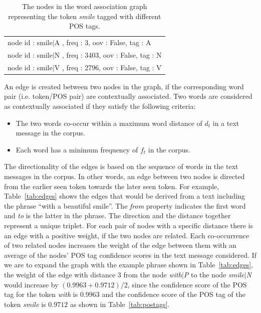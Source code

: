 \documentclass[preprint,review,12pt]{elsarticle}
\begin{document}
\begin{table}[hbt]
  \centering
  \begin{tabular}[tc]{l}
    node id : smile$|$A , freq : 3, oov : False, tag : A \\
    node id : smile$|$N , freq : 3403, oov : False, tag : N \\
    node id : smile$|$V , freq : 2796, oov : False, tag : V \\
  \end{tabular}
  \caption{The nodes in the word association graph representing the token \textit{smile} tagged with different POS tags.}
\label{tab:nodes}
\end{table}

An edge is created between two nodes in the graph, if the corresponding word pair (i.e. token/POS pair) are contextually associated. Two words are considered as contextually associated if they satisfy the following criteria:

\begin{itemize}
\item The two words co-occur within a maximum word distance of $d_t$ in a text message in the corpus.
\item Each word has a minimum frequency of $f_t$ in the corpus.
\end{itemize}

The directionality of the edges is based  on the sequence of words in the text messages in the corpus. In other words, an edge between two nodes is directed from the earlier seen token towards the later seen token. For example, Table~\ref{tab:edges} shows the edges that would be derived from a text including the phrase ``with a beautiful smile''. The \textit{from} property indicates the first word and \textit{to} is the latter in the phrase. The direction and the distance together represent a unique triplet. For each pair of nodes with a specific distance there is an edge with a positive weight, if the two nodes are related. Each co-occurrence of two related nodes increases the weight of the edge between them with an average of the nodes' POS tag confidence scores in the text message considered. If we are to expand the graph with the example phrase shown in Table~\ref{tab:edges}, the weight of the edge with distance $3$ from the node \emph{with$|$P}  to the node  \emph{smile$|$N} would increase by $(0.9963+0.9712)/2$, since the confidence score of the POS tag for the token \emph{with} is  $0.9963$ and the confidence score of the POS tag of the token \emph{smile} is $0.9712$ as shown in Table~\ref{tab:postags}.
\end{document}
